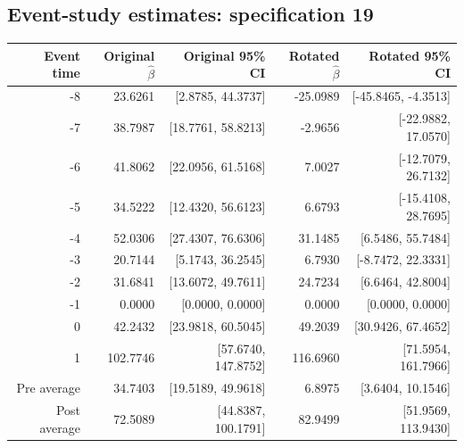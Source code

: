 \documentclass[10pt]{article}
\begin{document}
\subsection*{Event-study estimates: specification 19}
\begin{center}\scriptsize
\begin{tabular}{r rr rr}
\toprule
Event time & Original $\hat\beta$ & Original 95\% CI & Rotated $\hat\beta$ & Rotated 95\% CI \\
\midrule
-8 & 23.6261 & [2.8785, 44.3737] & -25.0989 & [-45.8465, -4.3513] \\
-7 & 38.7987 & [18.7761, 58.8213] & -2.9656 & [-22.9882, 17.0570] \\
-6 & 41.8062 & [22.0956, 61.5168] & 7.0027 & [-12.7079, 26.7132] \\
-5 & 34.5222 & [12.4320, 56.6123] & 6.6793 & [-15.4108, 28.7695] \\
-4 & 52.0306 & [27.4307, 76.6306] & 31.1485 & [6.5486, 55.7484] \\
-3 & 20.7144 & [5.1743, 36.2545] & 6.7930 & [-8.7472, 22.3331] \\
-2 & 31.6841 & [13.6072, 49.7611] & 24.7234 & [6.6464, 42.8004] \\
-1 & 0.0000 & [0.0000, 0.0000] & 0.0000 & [0.0000, 0.0000] \\
0 & 42.2432 & [23.9818, 60.5045] & 49.2039 & [30.9426, 67.4652] \\
1 & 102.7746 & [57.6740, 147.8752] & 116.6960 & [71.5954, 161.7966] \\
\midrule
Pre average & 34.7403 & [19.5189, 49.9618] & 6.8975 & [3.6404, 10.1546] \\
Post average & 72.5089 & [44.8387, 100.1791] & 82.9499 & [51.9569, 113.9430] \\
\bottomrule
\end{tabular}
\end{center}
\clearpage
\end{document}
